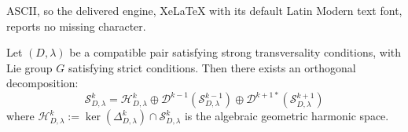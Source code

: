 \documentclass[10pt,a4paper]{amsart}
\begin{document}
ASCII, so the delivered engine, XeLaTeX with its default Latin Modern text font, reports no missing character.
\begin{theorem}
Let $(D,\lambda)$ be a compatible pair satisfying strong transversality conditions, with Lie group $G$ satisfying strict conditions. Then there exists an orthogonal decomposition:
\begin{equation}\label{eq:alg-hodge-detailed}
\mathcal{S}^k_{D,\lambda} = \mathcal{H}^k_{D,\lambda} \oplus \mathcal{D}^{k-1}(\mathcal{S}^{k-1}_{D,\lambda}) \oplus \mathcal{D}^{k+1*}(\mathcal{S}^{k+1}_{D,\lambda})
\end{equation}
where $\mathcal{H}^k_{D,\lambda} := \ker(\Delta^k_{D,\lambda}) \cap \mathcal{S}^k_{D,\lambda}$ is the algebraic geometric harmonic space.
\end{theorem}
\end{document}
